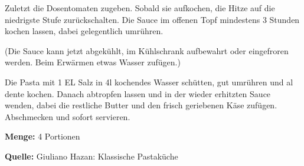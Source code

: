 {Zuletzt die Dosentomaten zugeben. Sobald sie aufkochen, die Hitze auf die niedrigste Stufe zurückschalten. Die Sauce im offenen Topf mindestens 3 Stunden kochen lassen, dabei gelegentlich umrühren.

(Die Sauce kann jetzt abgekühlt, im Kühlschrank aufbewahrt oder eingefroren werden. Beim Erwärmen etwas Wasser zufügen.)

Die Pasta mit 1 EL Salz in 4l kochendes Wasser schütten, gut umrühren und al dente kochen. Danach abtropfen lassen und in der wieder erhitzten Sauce wenden, dabei die restliche Butter und den frisch geriebenen Käse zufügen. Abschmecken und sofort servieren.


{\bfseries Menge:} 4 Portionen

{\bfseries Quelle:} Giuliano Hazan: Klassische Pastaküche 

} 

